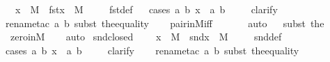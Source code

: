 \begin{isabellebody}
\ \ {\isachardoublequoteopen}x\ {\isasymin}\ M\ {\isasymLongrightarrow}\ fst{\isacharparenleft}{\kern0pt}x{\isacharparenright}{\kern0pt}\ {\isasymin}\ M{\isachardoublequoteclose}\ \isanewline
%
\isadelimproof
\ \ %
\endisadelimproof
%
\isatagproof
{}\isamarkupfalse%
\ fst{\isacharunderscore}{\kern0pt}def\isanewline
\ \ \isamarkupfalse%
{\isacharparenleft}{\kern0pt}cases\ {\isachardoublequoteopen}{\isasymexists}a\ b{\isachardot}{\kern0pt}\ x\ {\isacharequal}{\kern0pt}\ {\isacharless}{\kern0pt}a{\isacharcomma}{\kern0pt}\ b{\isachargreater}{\kern0pt}{\isachardoublequoteclose}{\isacharparenright}{\kern0pt}\ \isanewline
\ \ \isamarkupfalse%
\ clarify\isanewline
\ \ \ \isamarkupfalse%
{\isacharparenleft}{\kern0pt}rename{\isacharunderscore}{\kern0pt}tac\ a\ b{\isacharcomma}{\kern0pt}\ subst\ the{\isacharunderscore}{\kern0pt}equality{\isacharparenright}{\kern0pt}\isanewline
\ \ \isamarkupfalse%
\ pair{\isacharunderscore}{\kern0pt}in{\isacharunderscore}{\kern0pt}M{\isacharunderscore}{\kern0pt}iff\isanewline
\ \ \ \ \ \isamarkupfalse%
\ auto{\isacharbrackleft}{\kern0pt}{}{\isacharbrackright}{\kern0pt}\isanewline
\ \ \isamarkupfalse%
{\isacharparenleft}{\kern0pt}subst\ the{\isacharunderscore}{\kern0pt}{}{\isacharparenright}{\kern0pt}\isanewline
\ \ \isamarkupfalse%
\ zero{\isacharunderscore}{\kern0pt}in{\isacharunderscore}{\kern0pt}M\isanewline
\ \ \isamarkupfalse%
\ auto%
\endisatagproof
{\isafoldproof}%
%
\isadelimproof
\isanewline
%
\endisadelimproof
\isanewline
{}\isamarkupfalse%
\ snd{\isacharunderscore}{\kern0pt}closed\ {\isacharcolon}{\kern0pt}\ \isanewline
\ \ {\isachardoublequoteopen}x\ {\isasymin}\ M\ {\isasymLongrightarrow}\ snd{\isacharparenleft}{\kern0pt}x{\isacharparenright}{\kern0pt}\ {\isasymin}\ M{\isachardoublequoteclose}\ \isanewline
%
\isadelimproof
\ \ %
\endisadelimproof
%
\isatagproof
{}\isamarkupfalse%
\ snd{\isacharunderscore}{\kern0pt}def\isanewline
\ \ \isamarkupfalse%
{\isacharparenleft}{\kern0pt}cases\ {\isachardoublequoteopen}{\isasymexists}a\ b{\isachardot}{\kern0pt}\ x\ {\isacharequal}{\kern0pt}\ {\isacharless}{\kern0pt}a{\isacharcomma}{\kern0pt}\ b{\isachargreater}{\kern0pt}{\isachardoublequoteclose}{\isacharparenright}{\kern0pt}\ \isanewline
\ \ \isamarkupfalse%
\ clarify\isanewline
\ \ \ \isamarkupfalse%
{\isacharparenleft}{\kern0pt}rename{\isacharunderscore}{\kern0pt}tac\ a\ b{\isacharcomma}{\kern0pt}\ subst\ the{\isacharunderscore}{\kern0pt}equality{\isacharparenright}{\kern0pt}\isanewline

\end{isabellebody}
